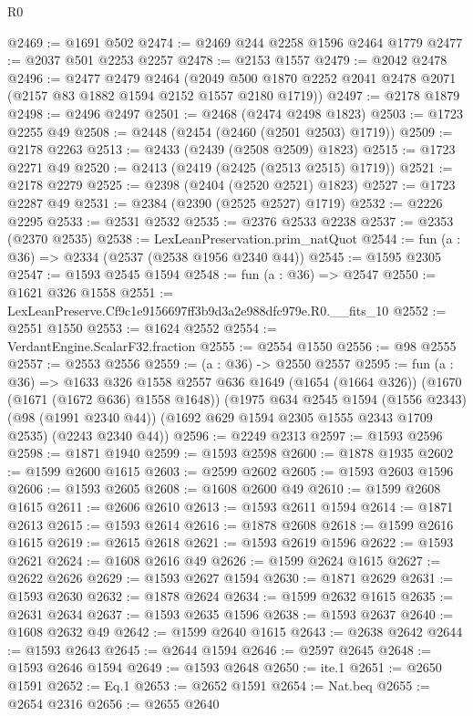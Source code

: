 \begin{lexlean}{R0}
\begin{coremodule}
@2469 := @1691 @502
@2474 := @2469 @244 @2258 @1596 @2464 @1779
@2477 := @2037 @501 @2253 @2257
@2478 := @2153 @1557
@2479 := @2042 @2478
@2496 := @2477
    @2479
    @2464
    (@2049 @500 @1870 @2252 @2041 @2478 @2071 (@2157 @83 @1882 @1594 @2152 @1557 @2180 @1719))
@2497 := @2178 @1879
@2498 := @2496 @2497
@2501 := @2468 (@2474 @2498 @1823)
@2503 := @1723 @2255 @49
@2508 := @2448 (@2454 (@2460 (@2501 @2503) @1719))
@2509 := @2178 @2263
@2513 := @2433 (@2439 (@2508 @2509) @1823)
@2515 := @1723 @2271 @49
@2520 := @2413 (@2419 (@2425 (@2513 @2515) @1719))
@2521 := @2178 @2279
@2525 := @2398 (@2404 (@2520 @2521) @1823)
@2527 := @1723 @2287 @49
@2531 := @2384 (@2390 (@2525 @2527) @1719)
@2532 := @2226 @2295
@2533 := @2531 @2532
@2535 := @2376 @2533 @2238
@2537 := @2353 (@2370 @2535)
@2538 := LexLeanPreservation.prim_natQuot
@2544 := fun (a : @36) => @2334 (@2537 (@2538 @1956 @2340 @44))
@2545 := @1595 @2305
@2547 := @1593 @2545 @1594
@2548 := fun (a : @36) => @2547
@2550 := @1621 @326 @1558
@2551 := LexLeanPreserve.Cf9c1e9156697ff3b9d3a2e988dfc979e.R0.__fits_10
@2552 := @2551 @1550
@2553 := @1624 @2552
@2554 := VerdantEngine.ScalarF32.fraction
@2555 := @2554 @1550
@2556 := @98 @2555
@2557 := @2553 @2556
@2559 := (a : @36) -> @2550 @2557
@2595 := fun (a : @36) =>
  @1633
    @326
    @1558
    @2557
    @636
    @1649
    (@1654 (@1664 @326))
    (@1670 (@1671 (@1672 @636) @1558 @1648))
    (@1975
      @634
      @2545
      @1594
      (@1556 @2343)
      (@98 (@1991 @2340 @44))
      (@1692 @629 @1594 @2305 @1555 @2343 @1709 @2535)
      (@2243 @2340 @44))
@2596 := @2249 @2313
@2597 := @1593 @2596
@2598 := @1871 @1940
@2599 := @1593 @2598
@2600 := @1878 @1935
@2602 := @1599 @2600 @1615
@2603 := @2599 @2602
@2605 := @1593 @2603 @1596
@2606 := @1593 @2605
@2608 := @1608 @2600 @49
@2610 := @1599 @2608 @1615
@2611 := @2606 @2610
@2613 := @1593 @2611 @1594
@2614 := @1871 @2613
@2615 := @1593 @2614
@2616 := @1878 @2608
@2618 := @1599 @2616 @1615
@2619 := @2615 @2618
@2621 := @1593 @2619 @1596
@2622 := @1593 @2621
@2624 := @1608 @2616 @49
@2626 := @1599 @2624 @1615
@2627 := @2622 @2626
@2629 := @1593 @2627 @1594
@2630 := @1871 @2629
@2631 := @1593 @2630
@2632 := @1878 @2624
@2634 := @1599 @2632 @1615
@2635 := @2631 @2634
@2637 := @1593 @2635 @1596
@2638 := @1593 @2637
@2640 := @1608 @2632 @49
@2642 := @1599 @2640 @1615
@2643 := @2638 @2642
@2644 := @1593 @2643
@2645 := @2644 @1594
@2646 := @2597 @2645
@2648 := @1593 @2646 @1594
@2649 := @1593 @2648
@2650 := ite.{1}
@2651 := @2650 @1591
@2652 := Eq.{1}
@2653 := @2652 @1591
@2654 := Nat.beq
@2655 := @2654 @2316
@2656 := @2655 @2640

\end{coremodule}
\end{lexlean}

